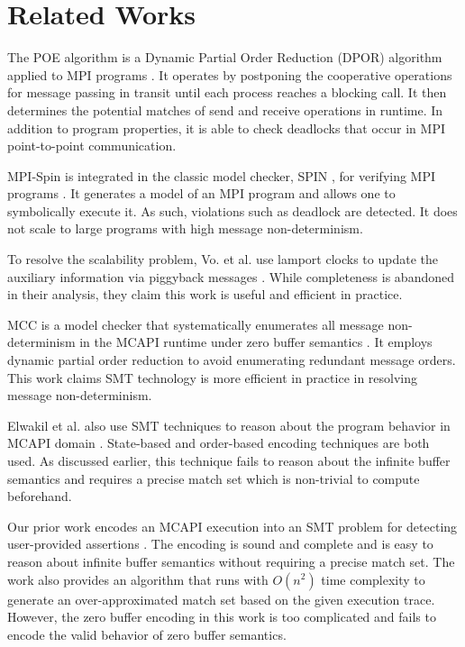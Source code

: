 \section{Related Works}
The POE algorithm is a Dynamic Partial Order Reduction (DPOR) algorithm \cite{DBLP:conf/popl/FlanaganG05} applied to MPI programs \cite{DBLP:conf/ppopp/VakkalankaSGK08}. It operates by postponing the cooperative operations for message passing in transit until each process reaches a blocking call. It then determines the potential matches of send and receive operations in runtime. In addition to program properties, it is able to check deadlocks that occur in MPI point-to-point communication.

MPI-Spin is integrated in the classic model checker, SPIN \cite{DBLP:journals/tse/Holzmann97}, for verifying MPI programs \cite{DBLP:conf/vmcai/Siegel07, DBLP:conf/pvm/Siegel07}. It generates a model of an MPI program and allows one to symbolically execute it. As such, violations such as deadlock are detected. It does not scale to large programs with high message non-determinism.

To resolve the scalability problem, Vo. et al. use lamport clocks to update the auxiliary information via piggyback messages \cite{DBLP:conf/sc/VoAGSSB10, DBLP:conf/IEEEpact/VoGKSSB11}. While completeness is abandoned in their analysis, they claim this work is useful and efficient in practice. 

MCC is a model checker that systematically enumerates all message non-determinism in the MCAPI runtime under zero buffer semantics \cite{DBLP:conf/fmcad/SharmaGMH09}. It employs dynamic partial order reduction to avoid enumerating redundant message orders. This work claims SMT technology is more efficient in practice in resolving message non-determinism. 

Elwakil et al. also use SMT techniques to reason about the program behavior in MCAPI domain \cite{DBLP:conf/issta/ElwakilY10, DBLP:conf/atva/ElwakilYW10}. State-based and order-based encoding techniques are both used. As discussed earlier, this technique fails to reason about the infinite buffer semantics and requires a precise match set which is non-trivial to compute beforehand.

Our prior work encodes an MCAPI execution into an SMT problem for detecting user-provided assertions \cite{DBLP:conf/kbse/HuangMM13}. The encoding is sound and complete and is easy to reason about infinite buffer semantics without requiring a precise match set. The work also provides an algorithm that runs with $O(n^2)$ time complexity to generate an over-approximated match set based on the given execution trace. However, the zero buffer encoding in this work is too complicated and fails to encode the valid behavior of zero buffer semantics. 

